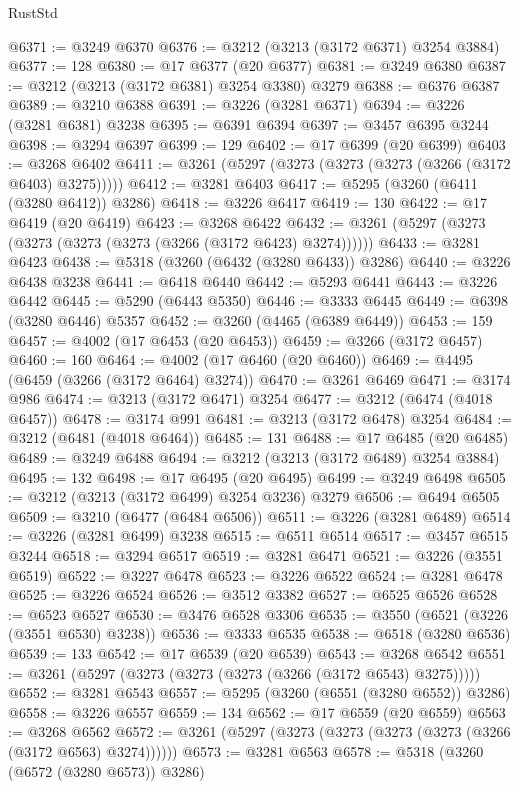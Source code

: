 \begin{lexlean}{RustStd}
\begin{coremodule}
{\begin{coremodule}
{{{{{{{{{{{{{{{{{{{{{{{{{{@6371 := @3249 @6370
@6376 := @3212 (@3213 (@3172 @6371) @3254 @3884)
@6377 := 128
@6380 := @17 @6377 (@20 @6377)
@6381 := @3249 @6380
@6387 := @3212 (@3213 (@3172 @6381) @3254 @3380) @3279
@6388 := @6376 @6387
@6389 := @3210 @6388
@6391 := @3226 (@3281 @6371)
@6394 := @3226 (@3281 @6381) @3238
@6395 := @6391 @6394
@6397 := @3457 @6395 @3244
@6398 := @3294 @6397
@6399 := 129
@6402 := @17 @6399 (@20 @6399)
@6403 := @3268 @6402
@6411 := @3261 (@5297 (@3273 (@3273 (@3273 (@3266 (@3172 @6403) @3275)))))
@6412 := @3281 @6403
@6417 := @5295 (@3260 (@6411 (@3280 @6412)) @3286)
@6418 := @3226 @6417
@6419 := 130
@6422 := @17 @6419 (@20 @6419)
@6423 := @3268 @6422
@6432 := @3261 (@5297 (@3273 (@3273 (@3273 (@3273 (@3266 (@3172 @6423) @3274))))))
@6433 := @3281 @6423
@6438 := @5318 (@3260 (@6432 (@3280 @6433)) @3286)
@6440 := @3226 @6438 @3238
@6441 := @6418 @6440
@6442 := @5293 @6441
@6443 := @3226 @6442
@6445 := @5290 (@6443 @5350)
@6446 := @3333 @6445
@6449 := @6398 (@3280 @6446) @5357
@6452 := @3260 (@4465 (@6389 @6449))
@6453 := 159
@6457 := @4002 (@17 @6453 (@20 @6453))
@6459 := @3266 (@3172 @6457)
@6460 := 160
@6464 := @4002 (@17 @6460 (@20 @6460))
@6469 := @4495 (@6459 (@3266 (@3172 @6464) @3274))
@6470 := @3261 @6469
@6471 := @3174 @986
@6474 := @3213 (@3172 @6471) @3254
@6477 := @3212 (@6474 (@4018 @6457))
@6478 := @3174 @991
@6481 := @3213 (@3172 @6478) @3254
@6484 := @3212 (@6481 (@4018 @6464))
@6485 := 131
@6488 := @17 @6485 (@20 @6485)
@6489 := @3249 @6488
@6494 := @3212 (@3213 (@3172 @6489) @3254 @3884)
@6495 := 132
@6498 := @17 @6495 (@20 @6495)
@6499 := @3249 @6498
@6505 := @3212 (@3213 (@3172 @6499) @3254 @3236) @3279
@6506 := @6494 @6505
@6509 := @3210 (@6477 (@6484 @6506))
@6511 := @3226 (@3281 @6489)
@6514 := @3226 (@3281 @6499) @3238
@6515 := @6511 @6514
@6517 := @3457 @6515 @3244
@6518 := @3294 @6517
@6519 := @3281 @6471
@6521 := @3226 (@3551 @6519)
@6522 := @3227 @6478
@6523 := @3226 @6522
@6524 := @3281 @6478
@6525 := @3226 @6524
@6526 := @3512 @3382
@6527 := @6525 @6526
@6528 := @6523 @6527
@6530 := @3476 @6528 @3306
@6535 := @3550 (@6521 (@3226 (@3551 @6530) @3238))
@6536 := @3333 @6535
@6538 := @6518 (@3280 @6536)
@6539 := 133
@6542 := @17 @6539 (@20 @6539)
@6543 := @3268 @6542
@6551 := @3261 (@5297 (@3273 (@3273 (@3273 (@3266 (@3172 @6543) @3275)))))
@6552 := @3281 @6543
@6557 := @5295 (@3260 (@6551 (@3280 @6552)) @3286)
@6558 := @3226 @6557
@6559 := 134
@6562 := @17 @6559 (@20 @6559)
@6563 := @3268 @6562
@6572 := @3261 (@5297 (@3273 (@3273 (@3273 (@3273 (@3266 (@3172 @6563) @3274))))))
@6573 := @3281 @6563
@6578 := @5318 (@3260 (@6572 (@3280 @6573)) @3286)
}}}}}}}}}}}}}}}}}}}}}}}}}}
\end{coremodule}}
\end{coremodule}
\end{lexlean}
